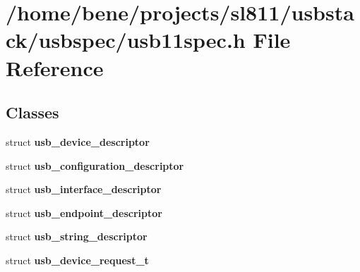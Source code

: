 \section{/home/bene/projects/sl811/usbstack/usbspec/usb11spec.h File Reference}
\label{usb11spec_8h}
\subsection*{Classes}
\begin{CompactItemize}
\item 
struct {\bf usb\_\-device\_\-descriptor}
\item 
struct {\bf usb\_\-configuration\_\-descriptor}
\item 
struct {\bf usb\_\-interface\_\-descriptor}
\item 
struct {\bf usb\_\-endpoint\_\-descriptor}
\item 
struct {\bf usb\_\-string\_\-descriptor}
\item 
struct {\bf usb\_\-device\_\-request\_\-t}
\end{CompactItemize}
